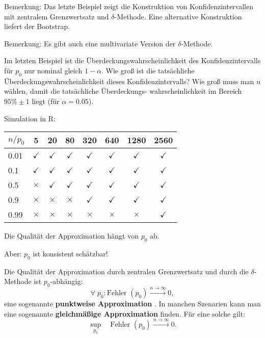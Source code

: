 \documentclass{tstextbook}
\begin{document}
\begin{remark}
	Bemerkung:
	Das letzte Beispiel zeigt die Konstruktion von Konfidenzintervallen mit zentralem Grenzwertsatz und $ \delta $-Methode. Eine alternative Konstruktion liefert der Bootstrap.
\end{remark}

\begin{remark}
	Bemerkung:
	Es gibt auch eine multivariate Version der $ \delta $-Methode.
\end{remark}

Im letzten Beispiel ist die Überdeckungswahrscheinlichkeit des Konfidenzintervalls für $ p_0 $ nur nominal gleich $ 1-\alpha $. Wie groß ist die tatsächliche Überdeckungswahrscheinlichkeit dieses Konfidenzintervalls? Wie groß muss man $ n $ wählen, damit die tatsächliche 
Überdeckungs- wahrscheinlichkeit im Bereich $ 95\%\pm1 $ liegt (für $ \alpha = 0.05 $).


Simulation in R: \\


\begin{tabular}{l|ccccccc}
	$ n/p_0 $	& 5	& 20	& 80 	& 320	& 640 	& 1280 	& 2560 \\
	\midrule
	0.01		& $\checkmark$	& $\checkmark$	& $\checkmark$	& $\checkmark$	& $\checkmark$	& $\checkmark$	& $\checkmark$ \\
	0.1			& $\checkmark$	& $\checkmark$	& $\checkmark$	& $\checkmark$	& $\checkmark$	& $\checkmark$	& $\checkmark$ \\
	0.5			& $\times$	& $\checkmark$	& $\checkmark$	& $\checkmark$	& $\checkmark$	& $\checkmark$	& $\checkmark$ \\
	0.9			& $\times$	& $\times$	& $\times$	& $\checkmark$	& $\checkmark$	& $\checkmark$	& $\checkmark$ \\
	0.99		& $\times$	& $\times$	& $\times$	& $\times$	& $\times$	& $\times$	& $\checkmark$
\end{tabular}
\vspace{0.5cm}

Die Qualität der Approximation hängt von $ p_0 $ ab. 

Aber: $ p_0 $ ist konsistent schätzbar! 

Die Qualität der Approximation durch zentralen Grenzwertsatz und durch die $ \delta $-Methode ist $ p_0 $-abhängig: 
\[
\forall\; p_0 \colon \text{Fehler }(p_0) \xrightarrow{n\to\infty} 0,
\]
eine sogenannte \textbf{punktweise Approximation} . In manchen Szenarien kann man eine sogenannte \textbf{gleichmäßige Approximation}  finden. Für eine solche gilt:
\[
\underset{p_0}{\sup} \quad \text{Fehler }(p_0) \xrightarrow{n\to\infty} 0.
\]
\end{document}
